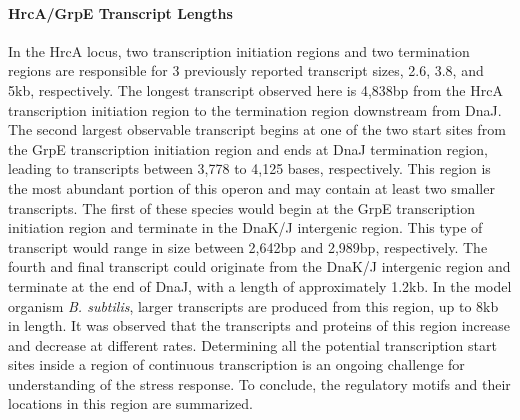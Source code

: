 \paragraph{HrcA/GrpE Transcript Lengths}
In the HrcA locus, two transcription initiation regions and two termination regions are responsible for 3 previously reported transcript sizes, 2.6, 3.8, and 5kb, respectively. The longest transcript observed here is 4,838bp from the HrcA transcription initiation region to the termination region downstream from DnaJ. The second largest observable transcript begins at one of the two start sites from the GrpE transcription initiation region and ends at DnaJ termination region, leading to transcripts between 3,778 to 4,125 bases, respectively. This region is the most abundant portion of this operon and may contain at least two smaller transcripts. The first of these species would begin at the GrpE transcription initiation region and terminate in the DnaK/J intergenic region. This type of transcript would range in size between 2,642bp and 2,989bp, respectively. The fourth and final transcript could originate from the DnaK/J intergenic region and terminate at the end of DnaJ, with a length of approximately 1.2kb. In the model organism \textit{B. subtilis}, larger transcripts are produced from this region, up to 8kb in length\cite{82}. It was observed that the transcripts and proteins of this region increase and decrease at different rates\cite{82}. Determining all the potential transcription start sites inside a region of continuous transcription is an ongoing challenge for understanding of the stress response. To conclude, the regulatory motifs and their locations in this region are summarized.

